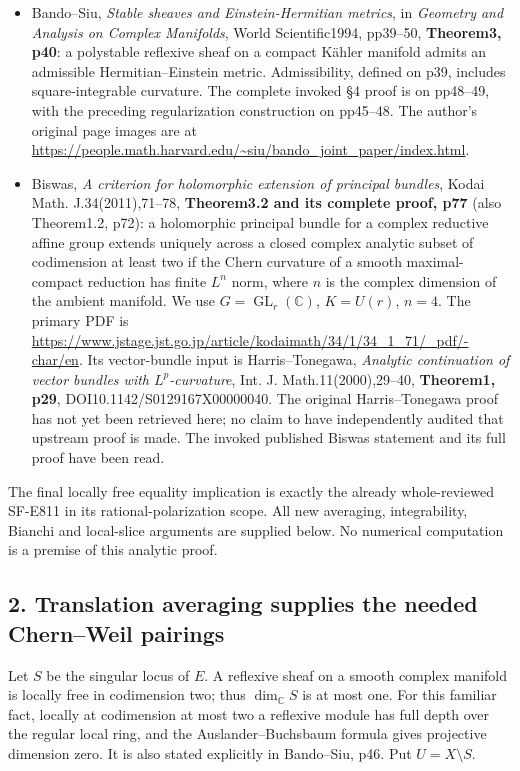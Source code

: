 \begin{itemize}
\item
  Bando--Siu, \emph{Stable sheaves and Einstein-Hermitian metrics}, in
  \emph{Geometry and Analysis on Complex Manifolds}, World
  Scientific1994, pp39--50, \textbf{Theorem3, p40}: a polystable
  reflexive sheaf on a compact Kähler manifold admits an admissible
  Hermitian--Einstein metric. Admissibility, defined on p39, includes
  square-integrable curvature. The complete invoked §4 proof is on
  pp48--49, with the preceding regularization construction on pp45--48.
  The author's original page images are at
  \url{https://people.math.harvard.edu/~siu/bando_joint_paper/index.html}.
\item
  Biswas, \emph{A criterion for holomorphic extension of principal
  bundles}, Kodai Math. J.34(2011),71--78, \textbf{Theorem3.2 and its
  complete proof, p77} (also Theorem1.2, p72): a holomorphic principal
  bundle for a complex reductive affine group extends uniquely across a
  closed complex analytic subset of codimension at least two if the
  Chern curvature of a smooth maximal-compact reduction has finite
  \(L^n\) norm, where \(n\) is the complex dimension of the ambient manifold.
  We use \(G=\operatorname{GL}_r(\mathbb C)\), \(K=U(r)\), \(n=4\). The primary PDF is
  \url{https://www.jstage.jst.go.jp/article/kodaimath/34/1/34_1_71/_pdf/-char/en}.
  Its vector-bundle input is Harris--Tonegawa, \emph{Analytic
  continuation of vector bundles with \(L^p\)-curvature}, Int. J.
  Math.11(2000),29--40, \textbf{Theorem1, p29},
  DOI10.1142/S0129167X00000040. The original Harris--Tonegawa proof has
  not yet been retrieved here; no claim to have independently audited
  that upstream proof is made. The invoked published Biswas statement
  and its full proof have been read.
\end{itemize}

The final locally free equality implication is exactly the already
whole-reviewed SF-E811 in its rational-polarization scope. All new
averaging, integrability, Bianchi and local-slice arguments are supplied
below. No numerical computation is a premise of this analytic proof.

\subsection{2. Translation averaging supplies the needed Chern--Weil
pairings}\label{SF-E834:translation-averaging-supplies-the-needed-chernweil-pairings}

Let \(S\) be the singular locus of \(E\). A reflexive sheaf on a smooth complex
manifold is locally free in codimension two; thus \(\dim_{\mathbb C}S\) is at most
one. For this familiar fact, locally at codimension at most two a
reflexive module has full depth over the regular local ring, and the
Auslander--Buchsbaum formula gives projective dimension zero. It is also
stated explicitly in Bando--Siu, p46. Put \(U=X\setminus S\).

